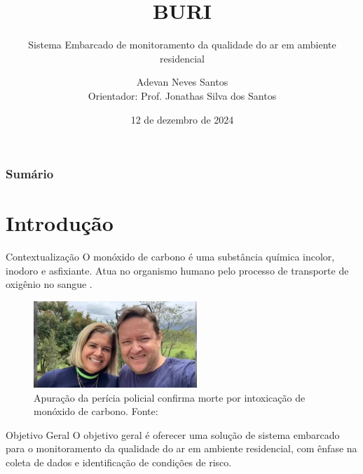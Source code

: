\documentclass[12pt]{beamer}
\title{BURI}
\subtitle{Sistema Embarcado de monitoramento da qualidade do ar em ambiente residencial}
\author{Adevan Neves Santos \\ Orientador: Prof. Jonathas Silva dos Santos}
\date{12 de dezembro de 2024}
\begin{document}
    \maketitle

    \begin{frame}
        \frametitle{Sumário}
        \tableofcontents
    \end{frame}

    \section{Introdução}

    \begin{frame}{Contextualização}
        O monóxido de carbono é uma substância química incolor, inodoro e asfixiante. Atua no organismo humano pelo processo 
        de transporte de oxigênio no sangue \cite{carbon-monoxide-poisoning-varon}.
        \begin{figure}[ht]
            \centering
            \includegraphics[width=0.55\textwidth]{img/morte-co.jpg}
            \caption{Apuração da perícia policial confirma morte por intoxicação de monóxido de carbono. Fonte: \cite{noticia-manaus-fumaca}}\label{fig:context}
        \end{figure}         
    \end{frame}

    \begin{frame}{Objetivo Geral}
        O objetivo geral é oferecer uma solução de sistema embarcado para o monitoramento
        da qualidade do ar em ambiente residencial, com ênfase na coleta de dados e identificação de
        condições de risco. 
    \end{frame}
\end{document}
